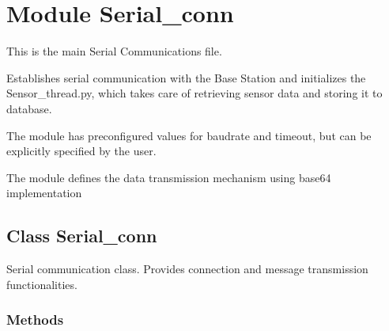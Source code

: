 %
%
%


\section{Module Serial\_conn}

    \label{Serial_conn}
This is the main Serial Communications file.

Establishes serial communication with the Base Station and initializes the 
Sensor\_thread.py, which takes care of retrieving sensor data and storing 
it to database.

The module has preconfigured values for baudrate and timeout, but can be 
explicitly specified by the user.

The module defines the data transmission mechanism using base64 
implementation



\subsection{Class Serial\_conn}

    \label{Serial_conn:Serial_conn}
Serial communication class. Provides connection and message transmission 
functionalities.



  \subsubsection{Methods}

    \label{Serial_conn:Serial_conn:__init__}

